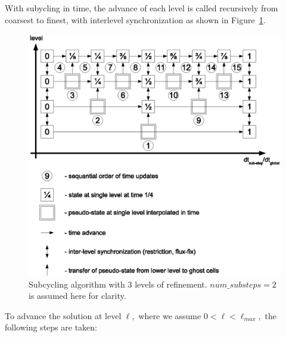 With subycling in time, the advance of each level is called
recursively from coarsest to finest,  with interlevel synchronization 
as shown in Figure~\ref{fig:subcycling_algorithm}. 
\begin{figure}[tb]
\centering
\includegraphics{./F_AdvancedTopics/subcycling_algorithm}
\caption{\label{fig:subcycling_algorithm} Subcycling algorithm with 3 levels of refinement. 
        $num\_substeps=2$ is assumed here for clarity. }
\end{figure}
To advance the solution at level $\ell,$ where we assume $0 < \ell < \ell_{max},$
the following steps are taken:
